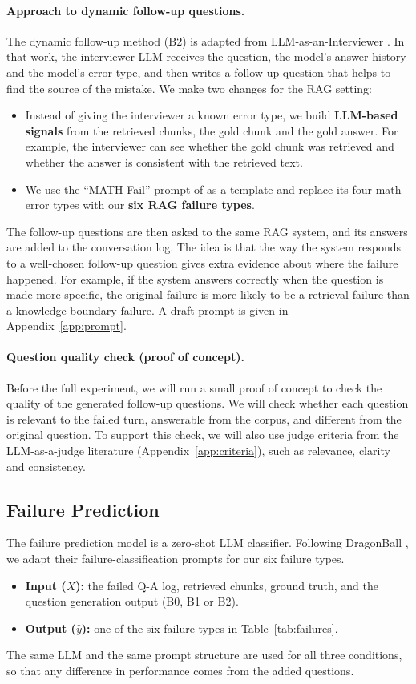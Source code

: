 \documentclass[11pt]{article}
\begin{document}
\paragraph{Approach to dynamic follow-up questions.}
The dynamic follow-up method (B2) is adapted from LLM-as-an-Interviewer \citep{kim2024interviewer}. In that work, the interviewer LLM receives the question, the model's answer history and the model's error type, and then writes a follow-up question that helps to find the source of the mistake. We make two changes for the RAG setting:
\begin{itemize}
  \item Instead of giving the interviewer a known error type, we build \textbf{LLM-based signals} from the retrieved chunks, the gold chunk and the gold answer. For example, the interviewer can see whether the gold chunk was retrieved and whether the answer is consistent with the retrieved text.
  \item We use the ``MATH Fail'' prompt of \citet{kim2024interviewer} as a template and replace its four math error types with our \textbf{six RAG failure types}.
\end{itemize}
The follow-up questions are then asked to the same RAG system, and its answers are added to the conversation log. The idea is that the way the system responds to a well-chosen follow-up question gives extra evidence about where the failure happened. For example, if the system answers correctly when the question is made more specific, the original failure is more likely to be a retrieval failure than a knowledge boundary failure. A draft prompt is given in Appendix~\ref{app:prompt}.

\paragraph{Question quality check (proof of concept).}
Before the full experiment, we will run a small proof of concept to check the quality of the generated follow-up questions. We will check whether each question is relevant to the failed turn, answerable from the corpus, and different from the original question. To support this check, we will also use judge criteria from the LLM-as-a-judge literature (Appendix~\ref{app:criteria}), such as relevance, clarity and consistency.

\subsection{Failure Prediction}
The failure prediction model is a zero-shot LLM classifier. Following DragonBall \citep{leung2025ragec}, we adapt their failure-classification prompts for our six failure types.
\begin{itemize}
  \item \textbf{Input ($X$):} the failed Q-A log, retrieved chunks, ground truth, and the question generation output (B0, B1 or B2).
  \item \textbf{Output ($\hat{y}$):} one of the six failure types in Table~\ref{tab:failures}.
\end{itemize}
The same LLM and the same prompt structure are used for all three conditions, so that any difference in performance comes from the added questions.
\end{document}
